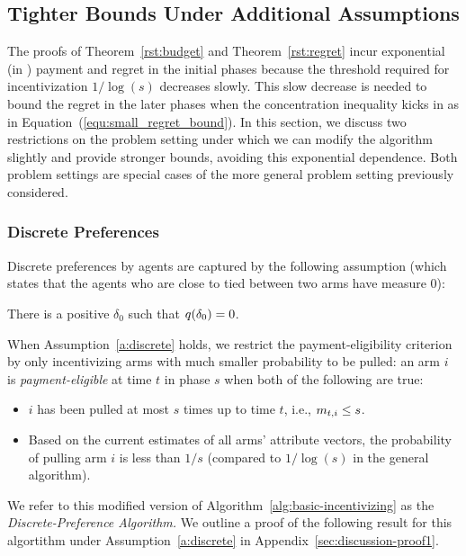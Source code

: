 \subsection{Tighter Bounds Under Additional Assumptions}

The proofs of Theorem~\ref{rst:budget} and Theorem~\ref{rst:regret} incur exponential (in \ARMNUM) payment and regret in the initial phases because the threshold required for incentivization $1/\log(s)$ decreases slowly.
This slow decrease is needed to bound the regret in the later phases when the concentration inequality kicks in as in Equation~(\ref{equ:small_regret_bound}).
In this section, we discuss two restrictions on the problem setting under which  we can modify the algorithm slightly and provide stronger bounds, avoiding this exponential dependence.
Both problem settings are special cases of the more general problem setting previously considered.

\subsubsection{Discrete Preferences}
\label{subsec:discrete}
Discrete preferences by agents are captured by the following assumption (which states that the agents who are close to tied between two arms have measure 0):

\begin{assumption}
\label{a:discrete}
There is a positive $\delta_0$ such that
$q(\delta_0) = 0$.
\end{assumption}

When Assumption~\ref{a:discrete} holds, we restrict the payment-eligibility criterion by only incentivizing arms with much smaller probability to be pulled: an arm $i$ is \emph{payment-eligible} at time $t$ in phase $s$ when both of the following are true:
\begin{itemize}
\item $i$ has been pulled at most
$s$ times up to time $t$, i.e., $m_{t,i} \leq s$.
\item Based on the current estimates  of all arms' attribute vectors, the probability of pulling arm $i$ is less than $1/s$ (compared to $1/\log(s)$ in the general algorithm).
\end{itemize}

We refer to this modified version of Algorithm~\ref{alg:basic-incentivizing} as the \emph{Discrete-Preference Algorithm.}
We outline a proof of the following result for this algortithm under Assumption~\ref{a:discrete} in Appendix~\ref{sec:discussion-proof1}.

